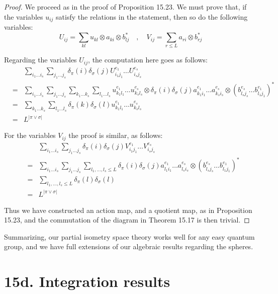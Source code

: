 \documentclass[12pt]{amsbook}
\begin{document}
\begin{proof}
We proceed as in the proof of Proposition 15.23. We must prove that, if the variables $u_{ij}$ satisfy the relations in the statement, then so do the following variables:
$$U_{ij}=\sum_{kl}u_{kl}\otimes a_{ki}\otimes b_{lj}^*\quad,\quad 
V_{ij}=\sum_{r\leq L}a_{ri}\otimes b_{rj}^*$$

Regarding the variables $U_{ij}$, the computation here goes as follows:
\begin{eqnarray*}
&&\sum_{i_1\ldots i_s}\sum_{j_1\ldots j_s}\delta_\pi(i)\delta_\sigma(j)U_{i_1j_1}^{e_1}\ldots U_{i_sj_s}^{e_s}\\
&=&\sum_{i_1\ldots i_s}\sum_{j_1\ldots j_s}\sum_{k_1\ldots k_s}\sum_{l_1\ldots l_s}u_{k_1l_1}^{e_1}\ldots u_{k_sl_s}^{e_s}\otimes \delta_\pi(i)\delta_\sigma(j)a_{k_1i_1}^{e_1}\ldots a_{k_si_s}^{e_s}\otimes(b_{l_sj_s}^{e_s}\ldots b_{l_1j_1}^{e_1})^*\\
&=&\sum_{k_1\ldots k_s}\sum_{l_1\ldots l_s}\delta_\pi(k)\delta_\sigma(l)u_{k_1l_1}^{e_1}\ldots u_{k_sl_s}^{e_s}\\
&=&L^{|\pi\vee\sigma|}
\end{eqnarray*}

For the variables $V_{ij}$ the proof is similar, as follows:
\begin{eqnarray*}
&&\sum_{i_1\ldots i_s}\sum_{j_1\ldots j_s}\delta_\pi(i)\delta_\sigma(j)V_{i_1j_1}^{e_1}\ldots V_{i_sj_s}^{e_s}\\
&=&\sum_{i_1\ldots i_s}\sum_{j_1\ldots j_s}\sum_{l_1,\ldots,l_s\leq L}\delta_\pi(i)\delta_\sigma(j)a_{l_1i_1}^{e_1}\ldots a_{l_si_s}^{e_s}\otimes(b_{l_sj_s}^{e_s}\ldots b_{l_1j_1}^{e_1})^*\\
&=&\sum_{l_1,\ldots,l_s\leq L}\delta_\pi(l)\delta_\sigma(l)\\
&=&L^{|\pi\vee\sigma|}
\end{eqnarray*}

Thus we have constructed an action map, and a quotient map, as in Proposition 15.23, and the commutation of the diagram in Theorem 15.17 is then trivial.
\end{proof}

Summarizing, our partial isometry space theory works well for any easy quantum group, and we have full extensions of our algebraic results regarding the spheres.

\section*{15d. Integration results}
\end{document}
